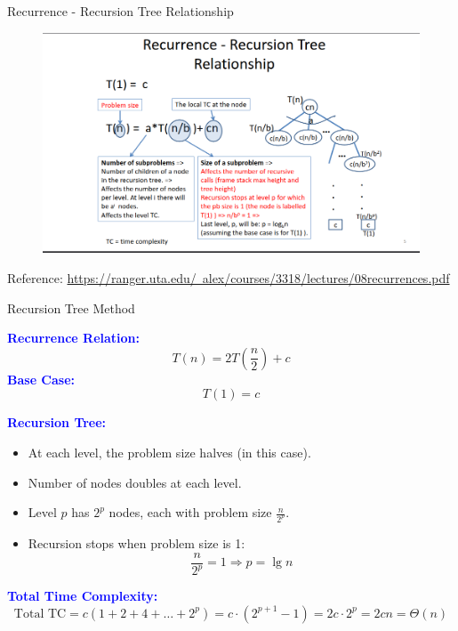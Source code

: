\begin{frame}{Recurrence - Recursion Tree Relationship}
\begin{figure}
    \centering
    \includegraphics[width=0.8\linewidth]{Selection_856.png}
    \label{fig:enter-label}
    
\end{figure}
\small
    Reference: \href{https://ranger.uta.edu/~alex/courses/3318/lectures/08_recurrences.pdf}{https://ranger.uta.edu/~alex/courses/3318/lectures/08recurrences.pdf}
\end{frame}

\begin{frame}{Recursion Tree Method}
    
    \small

    \textbf{\textcolor{blue}{Recurrence Relation:}}
    \small
    \[
    T(n) = 2T\left(\frac{n}{2}\right) + c
    \]
    \textbf{\textcolor{blue}{Base Case:}}
    \[
    T(1) = c
    \]

    \textbf{\textcolor{blue}{Recursion Tree:}}
    \small
    \begin{itemize}
        \item At each level, the problem size halves (in this case).
        \item Number of nodes doubles at each level.
        \item Level \( p \) has \( 2^p \) nodes, each with problem size \( \frac{n}{2^p} \).
        \item Recursion stops when problem size is 1:
        \[
        \frac{n}{2^p} = 1 \Rightarrow p = \lg n
        \]
    \end{itemize}
    \textbf{\textcolor{blue}{Total Time Complexity:}}
    \[
    \text{Total TC} = c(1 + 2 + 4 + \dots + 2^p) = c \cdot (2^{p+1} - 1) = 2c \cdot 2^p = 2cn = \Theta(n)
    \]
\end{frame}


